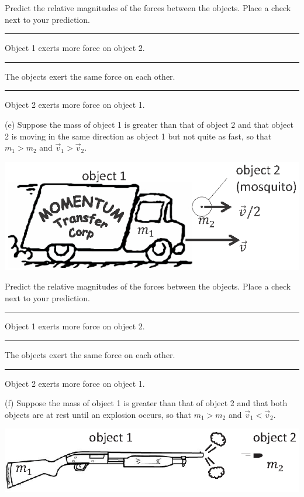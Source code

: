 \leftskip=1cm

Predict the relative magnitudes of the forces between the objects.
Place a check next to your prediction. 

\rule{0.5in}{0.1pt} Object 1 exerts more force on object 2. 

\rule{0.5in}{0.1pt} The objects exert the same force on each other.

\rule{0.5in}{0.1pt} Object 2 exerts more force on object 1.

\leftskip=0cm

\bigskip

\pagebreak[3]
(e) Suppose the mass of object 1 is greater than that of object 2 and that object
2 is moving in the same direction as object 1 but not quite as fast, so that
$m_{1}>m_{2}$ and
${\vec  v}_1>{\vec  v}_2$.

{\par\centering \includegraphics{newtons_laws/truck_mosquito.eps} \par}

\leftskip=1cm

Predict the relative magnitudes of the forces between the objects.
Place a check next to your prediction. 

\rule{0.5in}{0.1pt} Object 1 exerts more force on object 2. 

\rule{0.5in}{0.1pt} The objects exert the same force on each other. 

\rule{0.5in}{0.1pt} Object 2 exerts more force on object 1.

\leftskip=0cm

\bigskip

(f) Suppose the mass of object 1 is greater than that of object 2 and that both
objects are at rest until an explosion occurs, so that
$m_{1}>m_{2}$ and
${\vec  v}_1<{\vec  v}_2$.


{\par\centering \includegraphics{newtons_laws/rifle_bullet.eps} \par}

